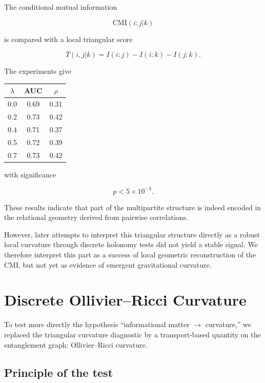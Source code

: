 \documentclass[11pt]{article}
\begin{document}
The conditional mutual information

\[
\mathrm{CMI}(i:j|k)
\]

is compared with a local triangular score

\[
T(i,j|k)=I(i:j)-I(i:k)-I(j:k).
\]

The experiments give

\begin{center}
\begin{tabular}{ccc}
\toprule
$\lambda$ & AUC & $\rho$ \\
\midrule
0.0 & 0.69 & 0.31 \\
0.2 & 0.73 & 0.42 \\
0.4 & 0.71 & 0.37 \\
0.5 & 0.72 & 0.39 \\
0.7 & 0.73 & 0.42 \\
\bottomrule
\end{tabular}
\end{center}

with significance

\[
p < 5\times10^{-3}.
\]

These results indicate that part of the multipartite structure is indeed encoded in the relational geometry derived from pairwise correlations.

However, later attempts to interpret this triangular structure directly as a robust local curvature through discrete holonomy tests did not yield a stable signal. We therefore interpret this part as a success of local geometric reconstruction of the CMI, but not yet as evidence of emergent gravitational curvature.


\section{Discrete Ollivier--Ricci Curvature}

To test more directly the hypothesis ``informational matter $\rightarrow$ curvature,'' we replaced the triangular curvature diagnostic by a transport-based quantity on the entanglement graph: Ollivier--Ricci curvature.

\subsection{Principle of the test}
\end{document}
